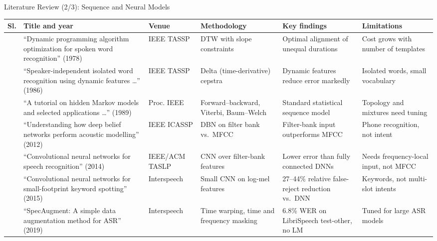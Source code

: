 \documentclass[aspectratio=169,10pt,xcolor=table]{beamer}
\newcommand{\lrfont}{\fontsize{7.0}{8.1}\selectfont}
\newcommand{\lrhead}{\rowcolor{hdrEdge}\textbf{Sl.} & \textbf{Title and year} & \textbf{Venue} & \textbf{Methodology} & \textbf{Key findings} & \textbf{Limitations}\\ \midrule}
\begin{document}
\begin{frame}{Literature Review (2/3): Sequence and Neural Models}
\lrfont
\begin{tabularx}{\linewidth}{@{}c L{3.75cm} L{1.4cm} Y Y Y@{}}
\toprule
\lrhead
\cite{sakoe1978dtw} & ``Dynamic programming algorithm optimization for spoken word recognition'' (1978) & IEEE TASSP & DTW with slope constraints & Optimal alignment of unequal durations & Cost grows with number of templates\\
\cite{furui1986delta} & ``Speaker-independent isolated word recognition using dynamic features \ldots'' (1986) & IEEE TASSP & Delta (time-derivative) cepstra & Dynamic features reduce error markedly & Isolated words, small vocabulary\\
\cite{rabiner1989hmm} & ``A tutorial on hidden Markov models and selected applications \ldots'' (1989) & Proc. IEEE & Forward--backward, Viterbi, Baum--Welch & Standard statistical sequence model & Topology and mixtures need tuning\\
\cite{mohamed2012understanding} & ``Understanding how deep belief networks perform acoustic modelling'' (2012) & IEEE ICASSP & DBN on filter bank vs.\ MFCC & Filter-bank input outperforms MFCC & Phone recognition, not intent\\
\cite{abdelhamid2014cnn} & ``Convolutional neural networks for speech recognition'' (2014) & IEEE/ACM TASLP & CNN over filter-bank features & Lower error than fully connected DNNs & Needs frequency-local input, not MFCC\\
\cite{sainath2015kws} & ``Convolutional neural networks for small-footprint keyword spotting'' (2015) & Interspeech & Small CNN on log-mel features & 27--44\% relative false-reject reduction vs.\ DNN & Keywords, not multi-slot intents\\
\cite{park2019specaugment} & ``SpecAugment: A simple data augmentation method for ASR'' (2019) & Interspeech & Time warping, time and frequency masking & 6.8\% WER on LibriSpeech test-other, no LM & Tuned for large ASR models\\
\bottomrule
\end{tabularx}
\end{frame}
\end{document}

